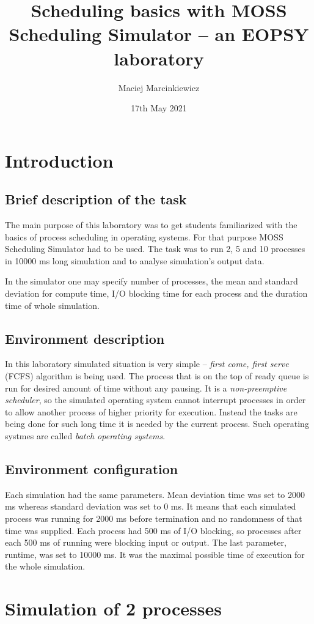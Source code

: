 \documentclass{article}
\title{Scheduling basics with MOSS Scheduling Simulator -- an EOPSY laboratory}
\author{Maciej Marcinkiewicz}
\date{17th May 2021}
\begin{document}
\maketitle

\section{Introduction}
\subsection{Brief description of the task}
The main purpose of this laboratory was to get students familiarized with the basics of
process scheduling in operating systems. For that purpose MOSS Scheduling Simulator had to
be used. The task was to run 2, 5 and 10 processes in 10000 ms long simulation and
to analyse simulation's output data.

In the simulator one may specify number of processes, the mean and standard deviation
for compute time, I/O blocking time for each process and the duration time of whole simulation.

\subsection{Environment description}
In this laboratory simulated situation is very simple -- \emph{first come, first serve}
(FCFS) algorithm is being used. The process that is on the top of
ready queue is run for desired amount of time without any pausing. It is a \emph{non-preemptive scheduler}, so the simulated
operating system cannot interrupt processes in order to allow another process of higher priority for
execution. Instead the tasks are being done for such long time it is needed by the current process.
Such operating systmes are called \emph{batch operating systems}.

\subsection{Environment configuration}
Each simulation had the same parameters. Mean deviation time was set to 2000 ms whereas
standard deviation was set to 0 ms. It means that each simulated process was running
for 2000 ms before termination and no randomness of that time was supplied.
Each process had 500 ms of I/O blocking, so processes after each 500 ms of running
were blocking input or output. The last parameter, runtime, was set to 10000 ms.
It was the maximal possible time of execution for the whole simulation.

\section{Simulation of 2 processes}
\end{document}
